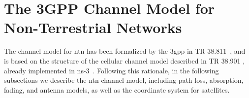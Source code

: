 



\section{The 3GPP Channel Model for Non-Terrestrial Networks}
\label{sec:channel-ntn}
The channel model for \gls{ntn} has been formalized by the \gls{3gpp} in TR 38.811~\cite{38811}, and is based on the structure of the cellular channel model described in TR 38.901 \cite{TR38901}, already implemented in ns-3~\cite{zugno20implementation}. 
Following this rationale, in the following subsections we describe the \gls{ntn} channel model, including path loss, absorption, fading, and antenna models, as well as the coordinate system for satellites. 


